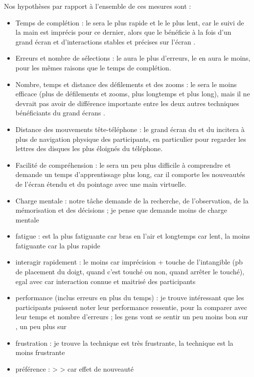 Nos hypothèses par rapport à l'ensemble de ces mesures sont :
\begin{itemize}
  \item Temps de complétion : le  sera le plus rapide et le  le plus lent, car le suivi de la main est imprécis pour ce dernier, alors que le  bénéficie à la fois d'un grand écran \citep{Liu2014} et d'interactions stables et précises sur l'écran \citep{Jones2012}.
  \item Erreurs et nombre de sélections : le  aura le plus d'erreurs, le  en aura le moins, pour les mêmes raisons que le temps de complétion.
  \item Nombre, temps et distance des défilements et des zooms : le  sera le moins efficace (plus de défilements et zooms, plus longtemps et plus long), mais il ne devrait pas avoir de différence importante entre les deux autres techniques bénéficiants du grand écrans \citep{Raedle2014}.
  \item Distance des mouvements tête-téléphone : le grand écran du  et du  incitera à plus de navigation physique des participants, en particulier pour regarder les lettres des disques les plus éloignés du téléphone.
  \item Facilité de compréhension : le  sera un peu plus difficile à comprendre et demande un temps d'apprentissage plus long, car il comporte les nouveautés de l'écran étendu et du pointage avec une main virtuelle.
  \item Charge mentale : notre tâche demande de la recherche, de l'observation, de la mémorisation et des décisions ; je pense que  demande moins de charge mentale
  \item fatigue :  est la plus fatiguante car bras en l'air et longtemps car lent,  la moins fatiguante car la plus rapide
  \item interagir rapidement :  le moins car imprécision + touche de l'intangible (pb de placement du doigt, quand c'est touché ou non, quand arrêter le touché),  egal avec  car interaction connue et maitrisé des participants
  \item performance (inclus erreurs en plus du temps) : je trouve intéressant que les participants puissent noter leur performance ressentie, pour la comparer avec leur temps et nombre d'erreurs ; les gens vont se sentir un peu moins bon sur , un peu plus sur 
  \item frustration : je trouve la technique  est très frustrante, la technique  est la moins frustrante
  \item préférence :  >  >  car effet de nouveauté
\end{itemize}


